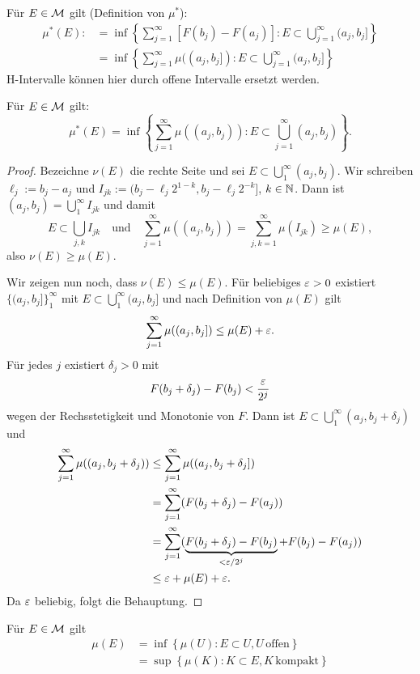 Für $E \in \mathcal{M}$ gilt (Definition von $\mu^*$):
\[ \begin{aligned} \mu^*(E) 
    :&= \inf \left\{ \sum_{j=1}^\infty [ F(b_j) - F(a_j) ] : E \subset \bigcup_{j=1}^\infty (a_j,b_j] \right\} \\
     &= \inf \left\{ \sum_{j=1}^\infty \mu((a_j,b_j]) : E \subset \bigcup_{j=1}^\infty (a_j,b_j] \right\}
   \end{aligned} \]
H-Intervalle können hier durch offene Intervalle ersetzt werden.

\begin{lem}
 Für $E \in \mathcal{M}$ gilt:
 \[ \mu^*(E) = \inf \left\{ \sum_{j=1}^\infty \mu((a_j,b_j)) : E \subset \bigcup_{j=1}^\infty (a_j,b_j) \right\}. \]
\end{lem}

\begin{proof}
 Bezeichne $\nu(E)$ die rechte Seite und sei $E \subset \bigcup_1^\infty
 (a_j,b_j)$. Wir schreiben $\ell_j := b_j - a_j$ und $I_{jk} := (b_j -\ell_j
 2^{1-k}, b_j - \ell_j 2^{-k}]$, $k \in \mathbb{N}$. Dann ist $(a_j,b_j) =
 \bigcup_1^\infty I_{jk}$ und damit
 \[ E \subset \bigcup_{j,k} I_{jk} \quad \text{und} \quad \sum_{j=1}^\infty \mu( (a_j, b_j) ) = \sum_{j,k=1}^\infty \mu(I_{jk}) \ge \mu(E), \]
 also $\nu(E) \ge \mu(E)$.
 
 Wir zeigen nun noch, dass $\nu(E) \le \mu(E)$. Für beliebiges $\varepsilon > 0$
 existiert $\{ (a_j, b_j] \}_1^\infty$ mit $E \subset \bigcup_1^\infty
 (a_j,b_j]$ und nach Definition von $\mu(E)$ gilt
 \[ \sum_{j=1}^\infty \mu((a_j,b_j]) \le \mu(E) + \varepsilon. \]
 Für jedes $j$ existiert $\delta_j > 0$ mit
 \[ F( b_j + \delta_j ) - F(b_j) < \frac{\varepsilon}{2^j} \]
 wegen der Rechsstetigkeit und Monotonie von $F$. Dann ist $E \subset
 \bigcup_1^\infty (a_j, b_j + \delta_j )$ und
 \[ \begin{aligned}
     \sum_{j=1}^\infty \mu((a_j,b_j+\delta_j)) 
     &\le \sum_{j=1}^\infty \mu((a_j,b_j+\delta_j]) \\
     &=   \sum_{j=1}^\infty ( F(b_j + \delta_j) - F(a_j) ) \\
     &=   \sum_{j=1}^\infty ( \underbrace{F(b_j + \delta_j) - F(b_j)}_{< \varepsilon/2^j} + F(b_j) - F(a_j) ) \\
     &\le \varepsilon + \mu(E) + \varepsilon.
    \end{aligned} \]
 Da $\varepsilon$ beliebig, folgt die Behauptung.
\end{proof}

\begin{thm}
 Für $E \in \mathcal{M}$ gilt
 \[ \begin{aligned}
    \mu(E) &= \inf \left\{ \mu(U) : E \subset U, U\, \text{offen} \right\} \\
           &= \sup \left\{ \mu(K) : K \subset E, K\, \text{kompakt} \right\} 
    \end{aligned} \]
\end{thm}

